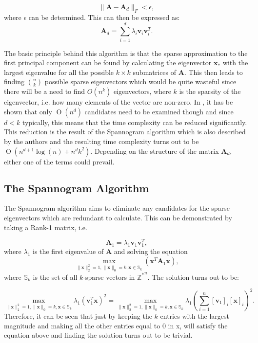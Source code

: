 \documentclass[graybox]{svmult}
\newcommand{\covmat}{\mathbf{A}}
\newcommand{\BigO}[1]{\ensuremath{\operatorname{O}\left(#1\right)}}
\begin{document}
\begin{equation*}
\|\mathbf{A} - \mathbf{A}_d\|_F < \epsilon,
\end{equation*}
where $\epsilon$ can be determined. This can then be expressed as:
\begin{equation*}
\mathbf{A}_d = \sum_{i=1}^d \lambda_i \mathbf{v}_i \mathbf{v}_i^T.
\end{equation*}

The basic principle behind this algorithm is that the sparse approximation to the first principal component can be found by calculating the eigenvector $\mathbf{x}_*$ with the largest eigenvalue for all the possible $k\times k$ submatrices of $\mathbf{A}$. This then leads to finding $n \choose k$ possible sparse eigenvectors which would be quite wasteful since there will be a need to find $O\left( n^k\right)$ eigenvectors, where $k$ is the sparsity of the eigenvector, i.e. how many elements of the vector are non-zero. In \cite{dimakis}, it has be shown that only $\BigO {n^d}$ candidates need to be examined though and since $d < k$ typically, this means that the time complexity can be reduced significantly. This reduction is the result of the Spannogram algorithm which is also described by the authors and the resulting time complexity turns out to be $\BigO { n^{d+1}\log(n) + n^d k^2 }$. Depending on the structure of the matrix $\covmat_d$, either one of the terms could prevail.


\subsection{The Spannogram Algorithm}

The Spannogram algorithm aims to eliminate any candidates for the sparse eigenvectors which are redundant to calculate. This can be demonstrated by taking a Rank-1 matrix, i.e.

\begin{equation*}
\mathbf{A}_1 = \lambda_1 \mathbf{v}_1 \mathbf{v}_1^T,
\end{equation*}
where $\lambda_1$ is the first eigenvalue of $\mathbf{A}$ and solving the equation
\begin{equation*}
 \underset{\|\mathbf{x}\|_2^2 = 1, \|\mathbf{x}\|_0 = k, \mathbf{x} \in\mathbb{S}_k} \max( \mathbf{x}^T\mathbf{A}_1\mathbf{x}),
\end{equation*}
where $\mathbb{S}_k$ is the set of all $k$-sparse vectors in $\mathbb{Z^*}^n$. The solution turns out to be:

\begin{equation*}
\underset{\|\mathbf{x}\|_2^2 = 1, \|\mathbf{x}\|_0 = k, \mathbf{x} \in\mathbb{S}_k} \max\lambda_1 \left(\mathbf{v}_1^T \mathbf{x}\right)^2 
= \underset{\|\mathbf{x}\|_2^2 = 1, \|\mathbf{x}\|_0 = k, \mathbf{x} \in\mathbb{S}_k} \max \lambda_1\left( \sum_{i = 1}^n [\mathbf{v}_{1}]_i [\mathbf{x}]_i\right)^2.
\end{equation*}
Therefore, it can be seen that just by keeping the $k$ entries with the largest magnitude and making all the other entries equal to 0 in x, will satisfy the equation above and finding the solution turns out to be trivial. 
\end{document}
